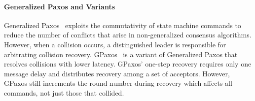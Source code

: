 \paragraph{Generalized Paxos and Variants}
Generalized Paxos~\cite{lamport2005generalized} exploits the commutativity of
state machine commands to reduce the number of conflicts that arise in
non-generalized consensus algorithms. However, when a collision occurs, a
distinguished leader is responsible for arbitrating collision recovery.
%
GPaxos~\cite{sutra2011fast} is a variant of Generalized Paxos that resolves
collisions with lower latency. GPaxos' one-step recovery requires only one
message delay and distributes recovery among a set of acceptors. However,
GPaxos still increments the round number during recovery which affects all
commands, not just those that collided.

